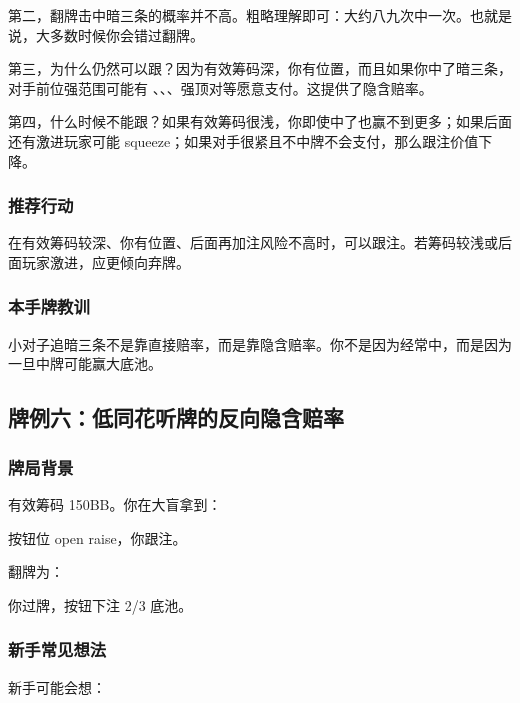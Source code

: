 第二，翻牌击中暗三条的概率并不高。粗略理解即可：大约八九次中一次。也就是说，大多数时候你会错过翻牌。

第三，为什么仍然可以跟？因为有效筹码深，你有位置，而且如果你中了暗三条，对手前位强范围可能有 、、、强顶对等愿意支付。这提供了隐含赔率。

第四，什么时候不能跟？如果有效筹码很浅，你即使中了也赢不到更多；如果后面还有激进玩家可能 squeeze；如果对手很紧且不中牌不会支付，那么跟注价值下降。

\subsubsection*{推荐行动}

在有效筹码较深、你有位置、后面再加注风险不高时，可以跟注。若筹码较浅或后面玩家激进，应更倾向弃牌。

\subsubsection*{本手牌教训}

小对子追暗三条不是靠直接赔率，而是靠隐含赔率。你不是因为经常中，而是因为一旦中牌可能赢大底池。

\subsection{牌例六：低同花听牌的反向隐含赔率}

\subsubsection*{牌局背景}

有效筹码 150BB。你在大盲拿到：

\begin{center}
\end{center}

按钮位 open raise，你跟注。

翻牌为：

\begin{center}
\end{center}

你过牌，按钮下注 2/3 底池。

\subsubsection*{新手常见想法}

新手可能会想：

